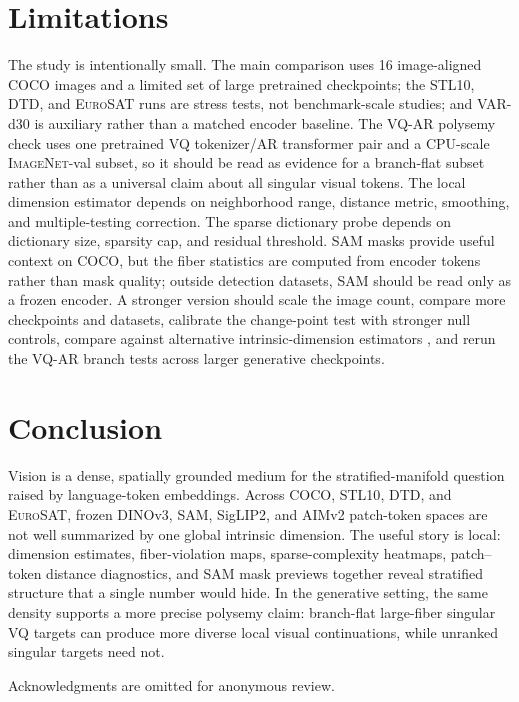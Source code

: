\documentclass{article}
\newcommand{\dataset}[1]{\textsc{#1}}
\begin{document}
\section{Limitations}
The study is intentionally small. The main comparison uses 16 image-aligned \dataset{COCO} images and a limited set of large pretrained checkpoints; the \dataset{STL10}, \dataset{DTD}, and \dataset{EuroSAT} runs are stress tests, not benchmark-scale studies; and VAR-d30 is auxiliary rather than a matched encoder baseline. The VQ-AR polysemy check uses one pretrained VQ tokenizer/AR transformer pair and a CPU-scale \dataset{ImageNet}-val subset, so it should be read as evidence for a branch-flat subset rather than as a universal claim about all singular visual tokens. The local dimension estimator depends on neighborhood range, distance metric, smoothing, and multiple-testing correction. The sparse dictionary probe depends on dictionary size, sparsity cap, and residual threshold. SAM masks provide useful context on \dataset{COCO}, but the fiber statistics are computed from encoder tokens rather than mask quality; outside detection datasets, SAM should be read only as a frozen encoder. A stronger version should scale the image count, compare more checkpoints and datasets, calibrate the change-point test with stronger null controls, compare against alternative intrinsic-dimension estimators \citep{facco2017estimating}, and rerun the VQ-AR branch tests across larger generative checkpoints.

\section{Conclusion}
Vision is a dense, spatially grounded medium for the stratified-manifold question raised by language-token embeddings. Across \dataset{COCO}, \dataset{STL10}, \dataset{DTD}, and \dataset{EuroSAT}, frozen DINOv3, SAM, SigLIP2, and AIMv2 patch-token spaces are not well summarized by one global intrinsic dimension. The useful story is local: dimension estimates, fiber-violation maps, sparse-complexity heatmaps, patch--token distance diagnostics, and SAM mask previews together reveal stratified structure that a single number would hide. In the generative setting, the same density supports a more precise polysemy claim: branch-flat large-fiber singular VQ targets can produce more diverse local visual continuations, while unranked singular targets need not.

\begin{ack}
Acknowledgments are omitted for anonymous review.
\end{ack}
\end{document}
